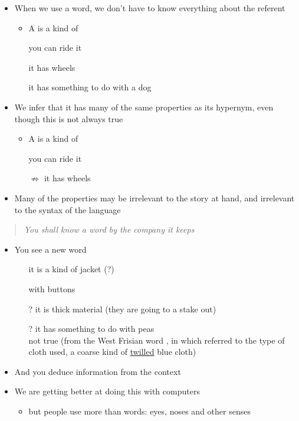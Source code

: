 \documentclass[headrule,footrule]{foils}
\begin{document}
\begin{itemize}\addtolength{\itemsep}{-1ex}
\item When we use a word, we don't have to know everything about the
  referent
  \begin{itemize}%
  \item A  is a kind of 
  \item[\ent] you can ride it
  \item[\ent] it has wheels
  \item[\ent] it has something to do with a dog
  \end{itemize}
\item We infer that it has many of the same properties as its
  hypernym, even though this is not always true
 \begin{itemize}%
  \item A  is a kind of 
  \item[\ent] you can ride it
  \item[$\not\Rightarrow$] it has wheels
  \end{itemize}
\item Many of the properties may be irrelevant to the story at hand,
  and irrelevant to the syntax of the language
\end{itemize}


\vspace*{-1ex}
\begin{quote}
  \textit{You shall know a word by the company it keeps} \hfill
\citep[p11]{Firth:1957}
\end{quote}
\vspace*{-1ex}
\begin{itemize}\addtolength{\itemsep}{-2ex}
\item You see a new word 
\\ 
\begin{itemize}
\item[\ent] it is a kind of jacket \hfill(?)
\item[\ent] with buttons
\item [?] it is thick material (they are going to a stake out)
\item[?] it has something to do with peas \\ not true (from the West
  Frisian word , in which  referred to the
  type of cloth used, a coarse kind of \ul{twilled} blue cloth)
\end{itemize}
\item And you deduce information from the context
\item We are getting better at doing this with computers
\begin{itemize}
\item but people use more than words: eyes, noses and other senses
\end{itemize}

\end{itemize}
\end{document}
